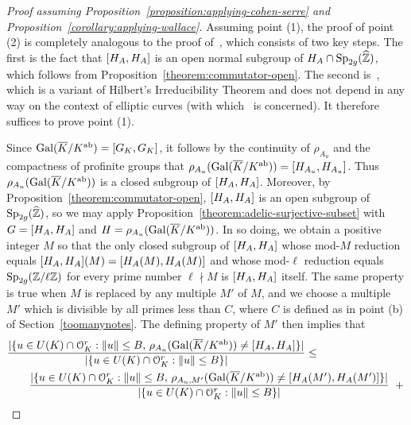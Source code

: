 	\begin{proof}[Proof assuming Proposition~\ref{proposition:applying-cohen-serre} and Proposition~\ref{corollary:applying-wallace}]
		Assuming point (1), the proof of point (2) is completely analogous to the proof of~\cite[Proposition 7.9(ii)]{zywina2010hilbert}, which consists of two key steps. The first is the fact that $[H_A, H_A]$ is an open normal subgroup of $H_A \cap \operatorname{Sp}_{2g}(\widehat{\mathbb Z})$, which follows from Proposition~\ref{theorem:commutator-open}. The second is~\cite[Proposition 7.7]{zywina2010hilbert}, which is a variant of Hilbert's Irreducibility Theorem and does not depend in any way on the context of elliptic curves (with which~\cite[Section 7]{zywina2010hilbert} is concerned). It therefore suffices to prove point (1).

Since $\operatorname{Gal}(\overline{K}/K^{\text{ab}}) = [G_K, G_K]$, it follows by the continuity of $\rho_{A_u}$ and the compactness of profinite groups that $\rho_{A_u}(\operatorname{Gal}(\overline K/K^{\text{ab}})) = [H_{A_u}, H_{A_u}]$.
Thus $\rho_{A_u}(\operatorname{Gal}(\overline K/K^{\text{ab}}))$ is a closed subgroup of $\left[H_A, H_A \right]$. Moreover, by Proposition~\ref{theorem:commutator-open}, $[ H_A, H_A ]$ is an open subgroup of $\operatorname{Sp}_{2g}(\widehat{{\mathbb Z}})$, so we may apply Proposition~\ref{theorem:adelic-surjective-subset} with $G = [ H_A, H_A ]$ and $H = \rho_{A_u}(\operatorname{Gal}(\overline K/K^{\text{ab}}))$. In so doing, we obtain a positive integer $M$ so that the only closed subgroup of $[H_A, H_A]$ whose mod-$M$ reduction equals $[H_A, H_A](M) = [H_A(M), H_A(M)]$ and whose mod-$\ell$ reduction equals $\operatorname{Sp}_{2g}({\mathbb Z}/\ell \mathbb Z)$ for every prime number $\ell \nmid M$ is $[H_A, H_A]$ itself. The same property is true when $M$ is replaced by any multiple $M'$ of $M$, and we choose a multiple $M'$ which is divisible by all primes less than $C$, where $C$ is defined as in point (b) of Section~\ref{toomanynotes}. The defining property of $M'$ then implies that
\begin{align}
			& \frac{|\{ u \in U(K) \cap \mathcal O_K^r : \|u \| \leq B,\, \rho_{A_u}(\Gal(\overline K/K^{\ab})) \neq [ \mono_A, \mono_A ] \}|}{|\{ u \in U(K) \cap \mathcal O_K^r : \|u \| \leq B \} |} \leq \nonumber \\
			& \qquad  \frac{|\{ u \in U(K) \cap \mathcal O_K^r : \|u \| \leq B,\, \rho_{A_u, M'}(\Gal(\overline K/K^{\ab})) \neq [ \mono_A(M'), \mono_A(M') ] \}|}{|\{ u \in U(K) \cap \mathcal O_K^r : \|u \| \leq B \} |}\,\,+ \raisetag{-0.6cm}{\label{equation:goursat-m-bound}}\\

\end{align}
\end{proof}
